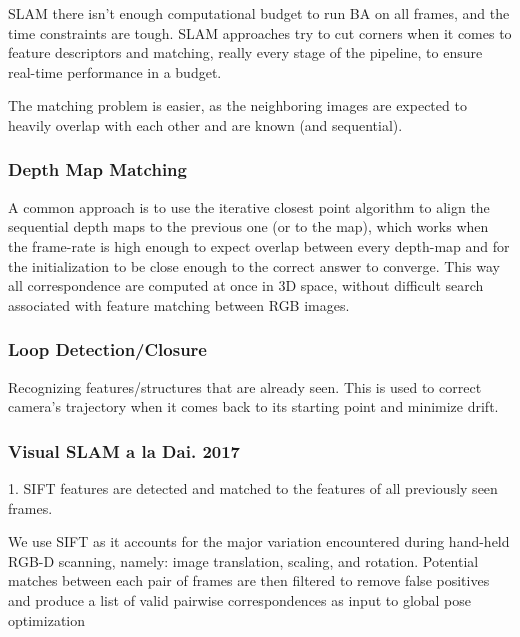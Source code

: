 SLAM there isn’t enough computational budget to run BA on all frames, and the time constraints are tough. SLAM approaches try to cut corners when it comes to feature descriptors and matching, really every stage of the pipeline, to ensure real-time performance in a budget. 

The matching problem is easier, as the  neighboring images are expected to heavily overlap with each other and are known (and sequential).

\subsubsection{Depth Map Matching}

A common approach is to use the iterative closest point algorithm to align the sequential depth maps to the previous one (or to the map), which works when the frame-rate is high enough to expect overlap between every depth-map and for the initialization to be close enough to the correct answer to converge. This way all correspondence are computed at once in 3D space, without difficult search associated with feature matching between RGB images.

\subsubsection{Loop Detection/Closure}

Recognizing features/structures that are already seen. This is used to correct camera's trajectory when it comes back to its starting point and minimize drift.

\subsubsection{Visual SLAM a la Dai. 2017}

1. SIFT features are detected and matched to the features of all previously seen frames. 

We use SIFT as it accounts for the major variation encountered during hand-held RGB-D scanning, namely: image translation, scaling, and rotation. Potential matches between each pair of frames are then filtered to remove false positives and produce a list of valid pairwise correspondences as input to global pose optimization

